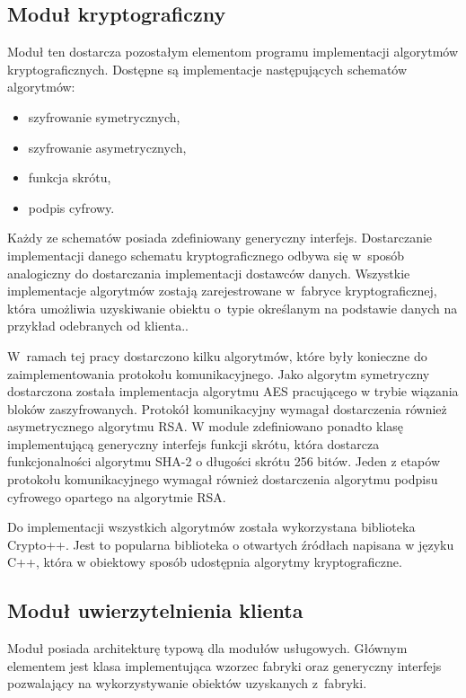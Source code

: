 \subsection[Moduł kryptograficzny][Moduł kryptograficzny]{Moduł kryptograficzny}

Moduł ten dostarcza pozostałym elementom programu implementacji
algorytmów kryptograficznych. Dostępne są implementacje następujących
schematów algorytmów:

\begin{itemize}
\item szyfrowanie symetrycznych,
\item szyfrowanie asymetrycznych,
\item funkcja skrótu,
\item podpis cyfrowy.
\end{itemize}

Każdy ze schematów posiada zdefiniowany generyczny
interfejs. Dostarczanie implementacji danego schematu
kryptograficznego odbywa się w~sposób analogiczny do dostarczania
implementacji dostawców danych. Wszystkie implementacje algorytmów
zostają zarejestrowane w~fabryce kryptograficznej, która umożliwia
uzyskiwanie obiektu o~typie określanym na podstawie danych na przykład
odebranych od klienta..

W~ramach tej pracy dostarczono kilku algorytmów, które były konieczne
do zaimplementowania protokołu komunikacyjnego. Jako algorytm
symetryczny dostarczona została implementacja algorytmu AES
pracującego w trybie wiązania bloków zaszyfrowanych. Protokół
komunikacyjny wymagał dostarczenia również asymetrycznego algorytmu
RSA. W module zdefiniowano ponadto klasę implementującą generyczny
interfejs funkcji skrótu, która dostarcza funkcjonalności algorytmu
SHA-2 o długości skrótu 256 bitów. Jeden z etapów protokołu
komunikacyjnego wymagał również dostarczenia algorytmu podpisu
cyfrowego opartego na algorytmie RSA.

Do implementacji wszystkich algorytmów została wykorzystana biblioteka
Crypto++. Jest to popularna biblioteka o otwartych źródłach napisana w
języku C++, która w obiektowy sposób udostępnia algorytmy
kryptograficzne.

\subsection[Moduł uwierzytelnienia][Moduł uwierzytelnienia klienta]{Moduł uwierzytelnienia klienta}

Moduł posiada architekturę typową dla modułów usługowych. Głównym
elementem jest klasa implementująca wzorzec fabryki oraz generyczny
interfejs pozwalający na wykorzystywanie obiektów uzyskanych
z~fabryki.

